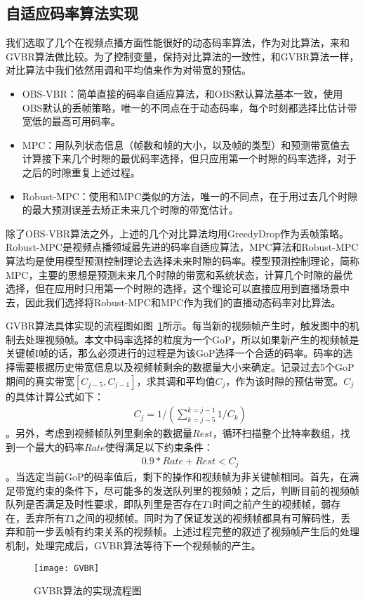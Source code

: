 \subsection{自适应码率算法实现}
我们选取了几个在视频点播方面性能很好的动态码率算法，作为对比算法，来和GVBR算法做比较。为了控制变量，保持对比算法的一致性，和GVBR算法一样，对比算法中我们依然用调和平均值来作为对带宽的预估。
\begin{itemize}
  \item OBS-VBR：简单直接的码率自适应算法，和OBS默认算法基本一致，使用OBS默认的丢帧策略，唯一的不同点在于动态码率，每个时刻都选择比估计带宽低的最高可用码率。
  \item MPC：用队列状态信息（帧数和帧的大小，以及帧的类型）和预测带宽值去计算接下来几个时隙的最优码率选择，但只应用第一个时隙的码率选择，对于之后的时隙重复上述过程。
  \item Robust-MPC：使用和MPC类似的方法，唯一的不同点，在于用过去几个时隙的最大预测误差去矫正未来几个时隙的带宽估计。
\end{itemize}
除了OBS-VBR算法之外，上述的几个对比算法均用GreedyDrop作为丢帧策略。Robust-MPC是视频点播领域最先进的码率自适应算法，MPC算法和Robust-MPC算法均是使用模型预测控制理论去选择未来时隙的码率。模型预测控制理论，简称MPC，主要的思想是预测未来几个时隙的带宽和系统状态，计算几个时隙的最优选择，但在应用时只用第一个时隙的选择，这个理论可以直接应用到直播场景中去，因此我们选择将Robust-MPC和MPC作为我们的直播动态码率对比算法。

GVBR算法具体实现的流程图如图~\ref{fig:GVBR}所示。每当新的视频帧产生时，触发图中的机制去处理视频帧。本文中码率选择的粒度为一个GoP，所以如果新产生的视频帧是关键帧I帧的话，那么必须进行的过程是为该GoP选择一个合适的码率。码率的选择需要根据历史带宽信息以及视频帧剩余的数据量大小来确定。记录过去5个GoP期间的真实带宽$[C_{j-5},C_{j-1}]$，求其调和平均值$C_j$，作为该时隙的预估带宽。$C_j$的具体计算公式如下：
\begin{eqnarray}
  &&   C_j = 1/(\sum_{k=j-5}^{k=j-1} 1/C_k)
\end{eqnarray}
。另外，考虑到视频帧队列里剩余的数据量$Rest$，循环扫描整个比特率数组，找到一个最大的码率$Rate$使得满足以下约束条件：
\begin{eqnarray}
  &&   0.9*Rate+Rest<C_j
\end{eqnarray}
。当选定当前GoP的码率值后，剩下的操作和视频帧为非关键帧相同。首先，在满足带宽约束的条件下，尽可能多的发送队列里的视频帧；之后，判断目前的视频帧队列是否满足及时性要求，即队列里是否存在$T1$时间之前产生的视频帧，弱存在，丢弃所有$T1$之间的视频帧。同时为了保证发送的视频帧都具有可解码性，丢弃和前一步丢帧有约束关系的视频帧。上述过程完整的叙述了视频帧产生后的处理机制，处理完成后，GVBR算法等待下一个视频帧的产生。
\begin{figure}[htb]
    \centering
    \texttt{[image: GVBR]}
    \caption{GVBR算法的实现流程图}
    \label{fig:GVBR}
\end{figure}

